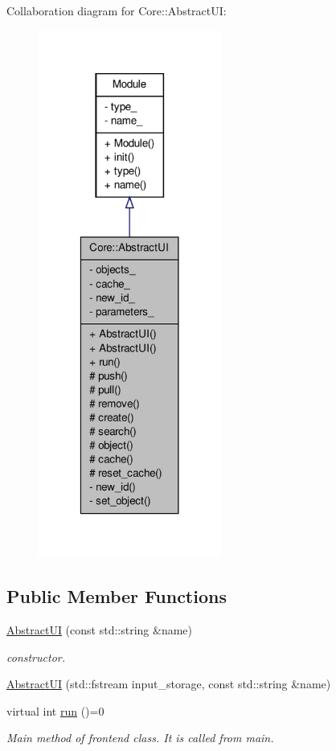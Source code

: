 Collaboration diagram for Core::AbstractUI:
\nopagebreak
\begin{figure}[H]
\begin{center}
\leavevmode
\includegraphics[width=170pt]{d0/d9b/classCore_1_1AbstractUI__coll__graph}
\end{center}
\end{figure}
\subsection*{Public Member Functions}
\begin{DoxyCompactItemize}
\item 
\hyperlink{classCore_1_1AbstractUI_a498c009d8806964b22d13ac2cf27479f}{AbstractUI} (const std::string \&name)
\begin{DoxyCompactList}\small\item\em constructor. \item\end{DoxyCompactList}\item 
\hyperlink{classCore_1_1AbstractUI_a92f84695ae72af96d9e5e3f024d2bafe}{AbstractUI} (std::fstream input\_\-storage, const std::string \&name)
\item 
virtual int \hyperlink{classCore_1_1AbstractUI_ac832b32700b97b1e0a6651efe7a1ce06}{run} ()=0
\begin{DoxyCompactList}\small\item\em Main method of frontend class. It is called from main. \item\end{DoxyCompactList}\end{DoxyCompactItemize}
